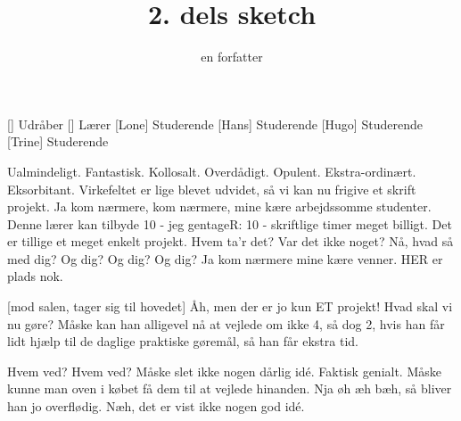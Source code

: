 \documentclass[a4paper,11pt]{article}
\title{2. dels sketch}
\author{en forfatter}
\begin{document}
\maketitle

\begin{roles}
  [] Udråber
  [] Lærer
  [Lone] Studerende
  [Hans] Studerende
  [Hugo] Studerende
  [Trine] Studerende
\end{roles}

\begin{sketch}


   Ualmindeligt.  Fantastisk.  Kollosalt.  Overdådigt.  Opulent.
  Ekstra-ordinært.  Eksorbitant.  Virkefeltet er lige blevet udvidet, så
  vi kan nu frigive et skrift projekt.  Ja kom nærmere, kom nærmere,
  mine kære arbejdssomme studenter.  Denne lærer kan tilbyde 10 - jeg
  gentageR: 10 - skriftlige timer meget billigt.  Det er tillige et
  meget enkelt projekt.  Hvem ta'r det?  Var det ikke noget?    Nå, hvad så med dig?   Og dig?   Og dig?  Og
  dig?   Ja kom nærmere mine kære venner.  HER er plads
  nok.


  [mod salen, tager sig til hovedet] Åh, men der er jo kun ET
  projekt!  Hvad skal vi nu gøre?  Måske kan
  han alligevel nå at vejlede om ikke 4, så dog 2, hvis han får lidt
  hjælp til de daglige praktiske gøremål, så han får ekstra tid.


   Hvem ved?  Hvem ved?  Måske slet ikke nogen dårlig idé.
  Faktisk genialt.  Måske kunne man oven i købet få dem til at vejlede
  hinanden.  Nja øh æh bæh, så bliver han jo
  overflødig.  Næh, det er vist ikke nogen god idé.


\end{sketch}
\end{document}
